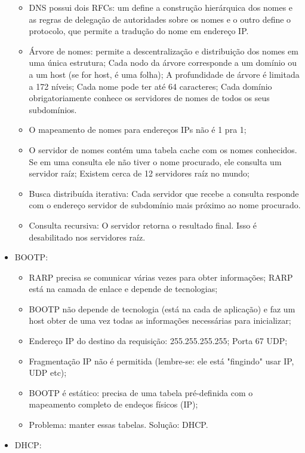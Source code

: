 \documentclass{article}
\begin{document}
\begin{itemize}
\begin{itemize}
         \item DNS possui dois RFCs: um define a construção hierárquica dos nomes e as regras de
delegação de autoridades sobre os nomes e o outro define o protocolo, que permite a tradução do nome
em endereço IP.
         \item Árvore de nomes: permite a descentralização e distribuição dos nomes em uma única
estrutura; Cada nodo da árvore corresponde a um domínio ou a um host (se for host, é uma folha); A
profundidade de árvore é limitada a 172 níveis; Cada nome pode ter até 64 caracteres; Cada domínio
obrigatoriamente conhece os servidores de nomes de todos os seus subdomínios.
         \item O mapeamento de nomes para endereços IPs não é 1 pra 1; 
         \item O servidor de nomes contém uma tabela cache com os nomes conhecidos. Se em uma
consulta ele não tiver o nome procurado, ele consulta um servidor raíz; Existem cerca de 12
servidores raíz no mundo;
         \item Busca distribuída iterativa: Cada servidor que recebe a consulta responde com o
endereço servidor de subdomínio mais próximo ao nome procurado.
         \item Consulta recursiva: O servidor retorna o resultado final. Isso é desabilitado nos
servidores raíz.
      \end{itemize}
   \item BOOTP:
      \begin{itemize}
         \item RARP precisa se comunicar várias vezes para obter informações; RARP está na camada de
enlace e depende de tecnologias;
         \item BOOTP não depende de tecnologia (está na cada de aplicação) e faz um host obter de
uma vez todas as informações necessárias para inicializar;
         \item Endereço IP do destino da requisição: 255.255.255.255; Porta 67 UDP;
         \item Fragmentação IP não é permitida (lembre-se: ele está "fingindo" usar IP, UDP etc);
         \item BOOTP é estático: precisa de uma tabela pré-definida com o mapeamento completo de
endeços físicos (IP);
         \item Problema: manter essas tabelas. Solução: DHCP.
      \end{itemize}
   \item DHCP:
      \begin{itemize}

\end{itemize}
\end{itemize}
\end{document}
